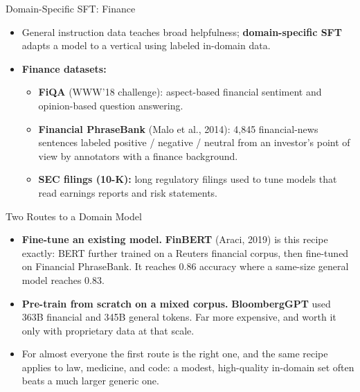 \begin{frame}{Domain-Specific SFT: Finance}
  \begin{itemize}\itemsep0.4em
    \item[\textcolor{red}{$\blacktriangleright$}] General instruction data teaches broad helpfulness; \textbf{domain-specific SFT} adapts a model to a vertical using labeled in-domain data.
    \item[\textcolor{red}{$\blacktriangleright$}] \textbf{Finance datasets:}
      \begin{itemize}
        \item \textbf{FiQA} (WWW'18 challenge): aspect-based financial sentiment and opinion-based question answering.
        \item \textbf{Financial PhraseBank} (Malo et al., 2014): 4{,}845 financial-news sentences labeled positive / negative / neutral from an investor's point of view by annotators with a finance background.
        \item \textbf{SEC filings (10-K):} long regulatory filings used to tune models that read earnings reports and risk statements.
      \end{itemize}
  \end{itemize}
\end{frame}

\begin{frame}[t]{Two Routes to a Domain Model}
  \begin{itemize}\itemsep0.5em
    \item[\textcolor{red}{$\blacktriangleright$}] \textbf{Fine-tune an existing model.} \textbf{FinBERT} (Araci, 2019) is this recipe exactly: BERT further trained on a Reuters financial corpus, then fine-tuned on Financial PhraseBank. It reaches 0.86 accuracy where a same-size general model reaches 0.83.
    \item[\textcolor{red}{$\blacktriangleright$}] \textbf{Pre-train from scratch on a mixed corpus.} \textbf{BloombergGPT} used 363B financial and 345B general tokens. Far more expensive, and worth it only with proprietary data at that scale.
    \item[\textcolor{red}{$\blacktriangleright$}] For almost everyone the first route is the right one, and the same recipe applies to law, medicine, and code: a modest, high-quality in-domain set often beats a much larger generic one.
  \end{itemize}
\end{frame}

